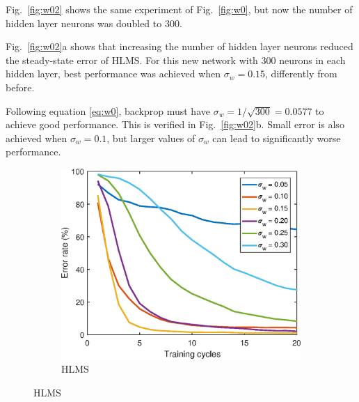 \documentclass[a4paper]{article}
\begin{document}
Fig.~\ref{fig:w02} shows the same experiment of Fig.~\ref{fig:w0}, but now the number of hidden layer neurons was doubled to 300. 

Fig.~\ref{fig:w02}a shows that increasing the number of hidden layer neurons reduced the steady-state error of HLMS. For this new network with 300 neurons in each hidden layer, best performance was achieved when $\sigma_w = 0.15$, differently from before.

Following equation \eqref{eq:w0}, backprop must have $\sigma_w = 1/\sqrt{300} = 0.0577$ to achieve good performance. This is verified in Fig.~\ref{fig:w02}b. Small error is also achieved when $\sigma_w = 0.1$, but larger values of $\sigma_w$ can lead to significantly worse performance.

\FloatBarrier
\begin{figure}[h!]
	\centering
	\begin{subfigure}[h!]{0.75\textwidth}
		\includegraphics[width=\textwidth]{figs/w0_hlms_300.eps}
		\caption{HLMS}
	\end{subfigure}%
	

\end{figure}
\end{document}
